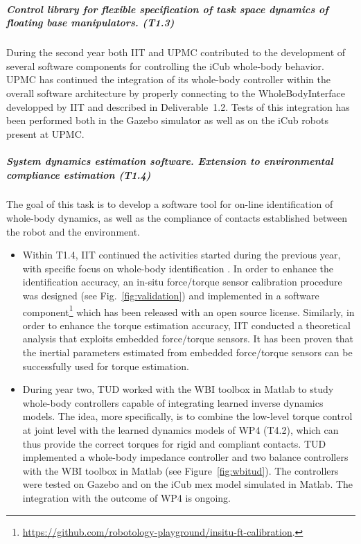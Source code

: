 \subparagraph{Control library for flexible specification of task space
  dynamics of floating base manipulators. (T1.3)}

During the second year both IIT and UPMC contributed to the development of
several software components for controlling the iCub whole-body behavior.
UPMC has continued the integration of its whole-body controller within the
overall software architecture by properly connecting to the WholeBodyInterface
developped by IIT and described in Deliverable~1.2.  Tests of this integration
has been performed both in the Gazebo simulator as well as on the iCub robots
present at UPMC.


\subparagraph{System dynamics estimation software. Extension to
environmental compliance estimation (T1.4)}

The goal of this task is to develop a software tool for on-line identification
of whole-body dynamics, as well as the compliance of contacts established
between the robot and the environment.

\begin{itemize}
\item Within T1.4, IIT continued the activities started during the previous
  year, with specific focus on whole-body identification \cite{Traversaro2013,
    Traversaro2014}.  In order to enhance the identification accuracy, an
  in-situ force/torque sensor calibration procedure was designed
  \cite{Traversaro2015b} (see Fig.~\ref{fig:validation}) and implemented in a
  software
  component\footnote{\url{https://github.com/robotology-playground/insitu-ft-calibration}.}
  which has been released with an open source license.  Similarly, in order to
  enhance the torque estimation accuracy, IIT conducted a theoretical analysis
  that exploits embedded force/torque sensors.  It has been proven
  \cite{Traversaro2015} that the inertial parameters estimated from embedded
  force/torque sensors can be successfully used for torque estimation.
\item During year two, TUD worked with the WBI toolbox in Matlab to study
  whole-body controllers capable of integrating learned inverse dynamics
  models.  The idea, more specifically, is to combine the low-level torque
  control at joint level with the learned dynamics models of WP4 (T4.2), which
  can thus provide the correct torques for rigid and compliant contacts.  TUD
  implemented a whole-body impedance controller and two balance controllers
  with the WBI toolbox in Matlab (see Figure~\ref{fig:wbitud}).  The
  controllers were tested on Gazebo and on the iCub mex model simulated in
  Matlab.  The integration with the outcome of WP4 is ongoing.
\end{itemize}


